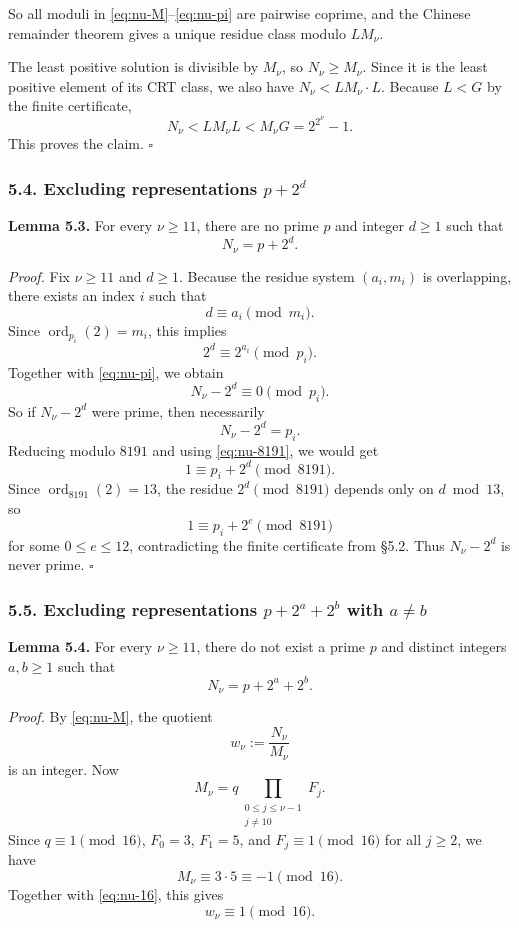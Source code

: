 So all moduli in \eqref{eq:nu-M}--\eqref{eq:nu-pi} are pairwise coprime, and the Chinese remainder theorem gives a unique residue class modulo $LM_\nu$.

The least positive solution is divisible by $M_\nu$, so $N_\nu\ge M_\nu$. Since it is the least positive element of its CRT class, we also have $N_\nu<LM_\nu\cdot L$. Because $L<G$ by the finite certificate,
\[
N_\nu<LM_\nu L < M_\nu G = 2^{2^\nu}-1.
\]
This proves the claim. \hfill$\square$

\subsubsection*{5.4. Excluding representations $p+2^d$}

\medskip
\noindent\textbf{Lemma 5.3.}
For every $\nu\ge 11$, there are no prime $p$ and integer $d\ge 1$ such that
\[
N_\nu=p+2^d.
\]

\medskip
\noindent\emph{Proof.}
Fix $\nu\ge 11$ and $d\ge 1$.
Because the residue system $(a_i,m_i)$ is overlapping, there exists an index $i$ such that
\[
d\equiv a_i\pmod{m_i}.
\]
Since $\operatorname{ord}_{p_i}(2)=m_i$, this implies
\[
2^d\equiv 2^{a_i}\pmod{p_i}.
\]
Together with \eqref{eq:nu-pi}, we obtain
\[
N_\nu-2^d\equiv 0\pmod{p_i}.
\]
So if $N_\nu-2^d$ were prime, then necessarily
\[
N_\nu-2^d=p_i.
\]
Reducing modulo $8191$ and using \eqref{eq:nu-8191}, we would get
\[
1\equiv p_i+2^d\pmod{8191}.
\]
Since $\operatorname{ord}_{8191}(2)=13$, the residue $2^d\pmod{8191}$ depends only on $d\bmod 13$, so
\[
1\equiv p_i+2^e\pmod{8191}
\]
for some $0\le e\le 12$, contradicting the finite certificate from \S 5.2.
Thus $N_\nu-2^d$ is never prime. \hfill$\square$

\subsubsection*{5.5. Excluding representations $p+2^a+2^b$ with $a\neq b$}

\medskip
\noindent\textbf{Lemma 5.4.}
For every $\nu\ge 11$, there do not exist a prime $p$ and distinct integers $a,b\ge 1$ such that
\[
N_\nu=p+2^a+2^b.
\]

\medskip
\noindent\emph{Proof.}
By \eqref{eq:nu-M}, the quotient
\[
w_\nu:=\frac{N_\nu}{M_\nu}
\]
is an integer.  Now
\[
M_\nu=q\prod_{\substack{0\le j\le \nu-1\\ j\neq 10}}F_j.
\]
Since $q\equiv 1\pmod{16}$, $F_0=3$, $F_1=5$, and $F_j\equiv 1\pmod{16}$ for all $j\ge 2$, we have
\[
M_\nu\equiv 3\cdot 5\equiv -1\pmod{16}.
\]
Together with \eqref{eq:nu-16}, this gives
\[
w_\nu\equiv 1\pmod{16}.
\]

